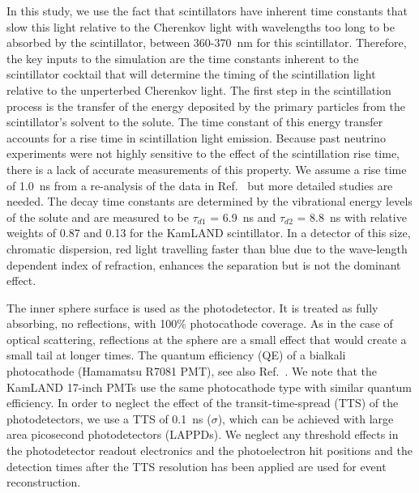 In this study, we use the fact that scintillators have inherent time constants that slow this light relative to the Cherenkov light with wavelengths too long to be absorbed by the scintillator, between 360-370~nm for this scintillator. Therefore, the key inputs to the simulation are the time constants inherent to the scintillator cocktail that will determine the timing of the scintillation light relative to the unperterbed Cherenkov light. The first step in the scintillation process is the transfer of the energy deposited by the primary particles from the scintillator's solvent to the solute. The time constant of this energy transfer accounts for a rise time in scintillation light emission. Because past neutrino experiments were not highly sensitive to the effect of the scintillation rise time, there is a lack of accurate measurements of this property. We assume a rise time of 1.0~ns from a re-analysis of the data in Ref.~\cite{CHRISTOPH'sTHESIS} but more detailed studies are needed. The decay time constants are determined by the vibrational energy levels of the solute and are measured to be $\tau_{d1}$ = 6.9~ns and $\tau_{d2}$ = 8.8~ns with relative weights of 0.87 and 0.13 for the KamLAND scintillator\cite{tajimaThesis}. In a detector of this size, chromatic dispersion, red light travelling faster than blue due to the wave-length dependent index of refraction, enhances the separation but is not the dominant effect.

The inner sphere surface is used as the photodetector. It is treated as fully absorbing, no reflections, with 100\% photocathode coverage. As in the case of optical scattering, reflections at the sphere are a small effect that would create a small tail at longer times. The quantum efficiency (QE) of a bialkali photocathode (Hamamatsu R7081 PMT)\cite{Hamamatsu_R7081}, see also Ref.~\cite{dctwo}. We note that the KamLAND 17-inch PMTs use the same photocathode type with similar quantum efficiency. In order to neglect the effect of the transit-time-spread (TTS) of the photodetectors, we use a TTS of 0.1~ns ($\sigma$), which can be achieved with large area picosecond photodetectors
(LAPPDs)\cite{anode_paper,PSEC4_paper,RSI_paper,Vienna2013,Ceramic_paper1,HV_paper,Timing_paper,Incom_paper}. We neglect any threshold effects in the photodetector readout electronics and the photoelectron hit positions and the detection times after the TTS resolution has been applied are used for event reconstruction.
